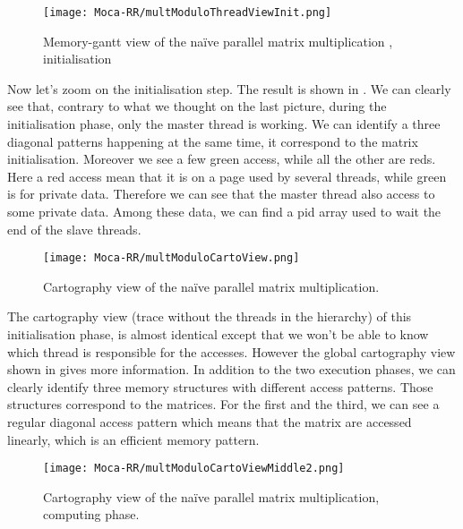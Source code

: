 \begin{figure}[htb]
    \centering
    \texttt{[image: Moca-RR/multModuloThreadViewInit.png]}
    \caption{Memory-gantt view of the naïve parallel matrix multiplication ,
    initialisation}
    \label{fig:ocelotl-th1}
\end{figure}

Now let's zoom on the initialisation step.
The result is shown in .
We can clearly see that, contrary to what we thought on the last picture, during the initialisation phase, only the master thread is working.
We can identify a three diagonal patterns happening at the same time, it correspond to the matrix initialisation.
Moreover we see a few green access, while all the other are reds.
Here a red access mean that it is on a page used by several threads, while green is for private data.
Therefore we can see that the master thread also access to some private data.
Among these data, we can find a pid array used to wait the end of the slave threads.

\begin{figure}[htb]
    \centering
    \texttt{[image: Moca-RR/multModuloCartoView.png]}
    \caption{Cartography view of the naïve parallel matrix multiplication.}
    \label{fig:ocelotl-carto0}
\end{figure}

The cartography view (trace without the threads in the hierarchy) of this initialisation phase, is almost identical except that we won't be able to know which thread is responsible for the accesses.
However the global cartography view shown in  gives more information.
In addition to the two execution phases, we can clearly identify three memory structures with different access patterns.
Those structures correspond to the matrices.
For the first and the third, we can see a regular diagonal access pattern which means that the matrix are accessed linearly, which is an efficient memory pattern.

\begin{figure}[htb]
    \centering
    \texttt{[image: Moca-RR/multModuloCartoViewMiddle2.png]}
    \caption{Cartography view of the naïve parallel matrix multiplication, computing phase.}
    \label{fig:ocelotl-Carto2}
\end{figure}

